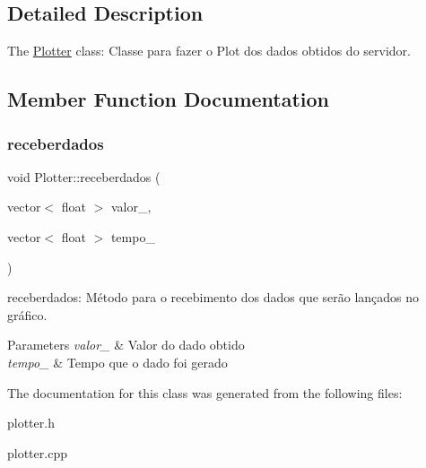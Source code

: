 \subsection{Detailed Description}
The \hyperlink{class_plotter}{Plotter} class\+: Classe para fazer o Plot dos dados obtidos do servidor. 

\subsection{Member Function Documentation}
\mbox{\label{class_plotter_ad8f58fe5e3cc3e18c8c0a61339ad8bc9}} 
\subsubsection{\texorpdfstring{receberdados}{receberdados}}
{\footnotesize\ttfamily void Plotter\+::receberdados (\begin{DoxyParamCaption}\item[{vector$<$ float $>$}]{valor\+\_\+,  }\item[{vector$<$ float $>$}]{tempo\+\_\+ }\end{DoxyParamCaption})\hspace{0.3cm}{\ttfamily [slot]}}



receberdados\+: Método para o recebimento dos dados que serão lançados no gráfico. 


\begin{DoxyParams}{Parameters}
{\em valor\+\_\+} & Valor do dado obtido \\
\hline
{\em tempo\+\_\+} & Tempo que o dado foi gerado \\
\hline
\end{DoxyParams}


The documentation for this class was generated from the following files\+:\begin{DoxyCompactItemize}
\item 
plotter.\+h\item 
plotter.\+cpp\end{DoxyCompactItemize}
